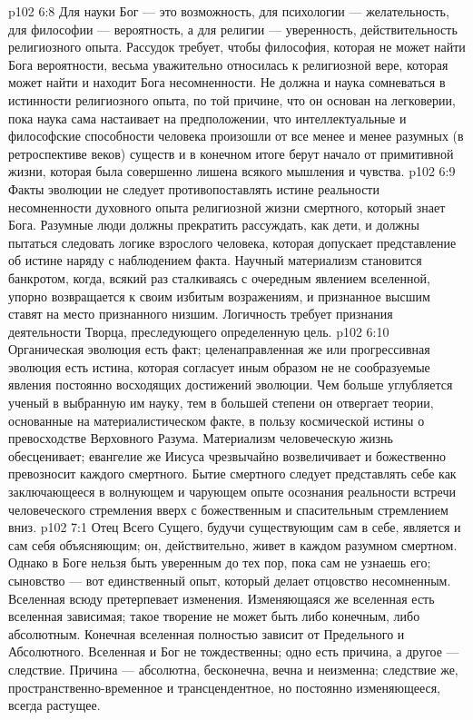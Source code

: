 \vs p102 6:8 \pc Для науки Бог --- это возможность, для психологии --- желательность, для философии --- вероятность, а для религии --- уверенность, действительность религиозного опыта. Рассудок требует, чтобы философия, которая не может найти Бога вероятности, весьма уважительно относилась к религиозной вере, которая может найти и находит Бога несомненности. Не должна и наука сомневаться в истинности религиозного опыта, по той причине, что он основан на легковерии, пока наука сама настаивает на предположении, что интеллектуальные и философские способности человека произошли от все менее и менее разумных (в ретроспективе веков) существ и в конечном итоге берут начало от примитивной жизни, которая была совершенно лишена всякого мышления и чувства.
\vs p102 6:9 Факты эволюции не следует противопоставлять истине реальности несомненности духовного опыта религиозной жизни смертного, который знает Бога. Разумные люди должны прекратить рассуждать, как дети, и должны пытаться следовать логике взрослого человека, которая допускает представление об истине наряду с наблюдением факта. Научный материализм становится банкротом, когда, всякий раз сталкиваясь с очередным явлением вселенной, упорно возвращается к своим избитым возражениям, и признанное высшим ставят на место признанного низшим. Логичность требует признания деятельности Творца, преследующего определенную цель.
\vs p102 6:10 Органическая эволюция есть факт; целенаправленная же или прогрессивная эволюция есть истина, которая согласует иным образом не не сообразуемые явления постоянно восходящих достижений эволюции. Чем больше углубляется ученый в выбранную им науку, тем в большей степени он отвергает теории, основанные на материалистическом факте, в пользу космической истины о превосходстве Верховного Разума. Материализм человеческую жизнь обесценивает; евангелие же Иисуса чрезвычайно возвеличивает и божественно превозносит каждого смертного. Бытие смертного следует представлять себе как заключающееся в волнующем и чарующем опыте осознания реальности встречи человеческого стремления вверх с божественным и спасительным стремлением вниз.
\vs p102 7:1 Отец Всего Сущего, будучи существующим сам в себе, является и сам себя объясняющим; он, действительно, живет в каждом разумном смертном. Однако в Боге нельзя быть уверенным до тех пор, пока сам не узнаешь его; сыновство --- вот единственный опыт, который делает отцовство несомненным. Вселенная всюду претерпевает изменения. Изменяющаяся же вселенная есть вселенная зависимая; такое творение не может быть либо конечным, либо абсолютным. Конечная вселенная полностью зависит от Предельного и Абсолютного. Вселенная и Бог не тождественны; одно есть причина, а другое --- следствие. Причина --- абсолютна, бесконечна, вечна и неизменна; следствие же, пространственно\hyp{}временное и трансцендентное, но постоянно изменяющееся, всегда растущее.
